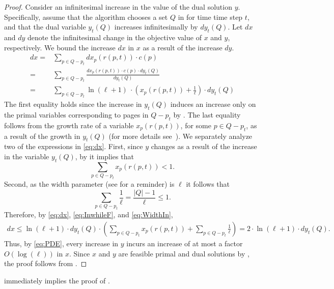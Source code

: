 \documentclass[11pt]{article}
\begin{document}
{\begin{proof}
	Consider an infinitesimal increase in the value of the dual solution $y$. Specifically, assume that the algorithm chooses a set $Q$ in  for time time step $t$, and that the dual variable $y_t(Q)$ increases infinitesimally by $d y_t(Q)$. Let $dx$ and $dy$ denote the infinitesimal change in the objective value of $x$ and $y$, respectively. We bound the increase $dx$ in $x$ as a result of the increase $dy$.   
	\begin{equation}
		\label{eq:dx}
		\begin{aligned}
			dx ={} & \sum_{p \in Q-p_t} d x_p(r(p,t)) \cdot c(p) \\
			={} & \sum_{p \in Q-p_t}  \frac{d x_p(r(p,t)) \cdot c(p) \cdot d y_t(Q)}{d y_t(Q)} \\
			={} & \sum_{p \in Q-p_t} \ln \left(\ell+1 \right)\ \cdot \left( x_p(r(p,t))+\frac{1}{\ell} \right) \cdot d y_t(Q)
		\end{aligned}
	\end{equation} The first equality holds since the increase in $y_t(Q)$ induces an increase only on the primal variables corresponding to pages in $Q-p_t$ by . The last equality follows from the growth rate of a variable $x_p(r(p,t))$, for some $p \in Q-p_t$, as a result of the growth in $y_t(Q)$ (for more details see~\cite{bansal2012primal,bansal2012randomized}). We separately analyze two of the expressions in \eqref{eq:dx}. First, since $y$ changes as a result of the increase in the variable $y_t(Q)$, by  it implies that 
	\begin{equation}
		\label{eq:InwhileF}
		\sum_{p \in Q-p_t} x_p(r(p,t)) < 1.
	\end{equation} Second, as the width parameter (see  for a reminder) is $\ell$ it follows that 
	\begin{equation}
		\label{eq:WidthIn}
		\sum_{p \in Q-p_t} \frac{1}{\ell} = \frac{|Q|-1}{\ell} \leq 1. 
	\end{equation} Therefore, by \eqref{eq:dx}, \eqref{eq:InwhileF}, and \eqref{eq:WidthIn},
	\begin{equation}
		\label{eq:PDE}
		\begin{aligned}
			dx \leq  \ln \left(\ell+1 \right) \cdot d y_t(Q) \cdot \left(  	\sum_{p \in Q-p_t} x_p(r(p,t)) + 	\sum_{p \in Q-p_t} \frac{1}{\ell} \right) = 2 \cdot  \ln \left(\ell+1 \right) \cdot d y_t(Q). 
		\end{aligned}
	\end{equation} Thus, by \eqref{eq:PDE}, every increase in $y$ incurs an increase of at most a factor $O(\log (\ell))$ in $x$. Since $x$ and $y$ are feasible primal and dual solutions by , the proof follows from . 
	
\end{proof}

 immediately implies the proof of . 

}
\end{document}

